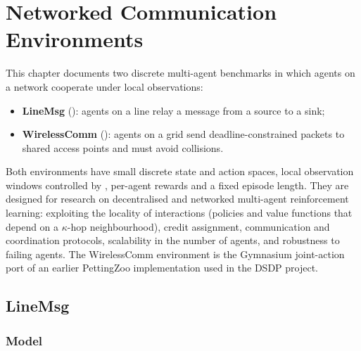 \begingroup
\setlength{\emergencystretch}{3em}
\chapter{Networked Communication Environments}\label{chap:networked}

This chapter documents two discrete multi-agent benchmarks in which agents on a
network cooperate under local observations:

\begin{itemize}
  \item \textbf{LineMsg} (): agents on
        a line relay a message from a source to a sink;
  \item \textbf{WirelessComm}
        (): agents on a grid
        send deadline-constrained packets to shared access points and must avoid
        collisions.
\end{itemize}

Both environments have small discrete state and action spaces, local
observation windows controlled by , per-agent rewards
and a fixed episode length. They are designed for research on decentralised
and networked multi-agent reinforcement learning: exploiting the locality of
interactions (policies and value functions that depend on a $\kappa$-hop
neighbourhood), credit assignment, communication and coordination protocols,
scalability in the number of agents, and robustness to failing agents. The
WirelessComm environment is the Gymnasium joint-action port of an earlier
PettingZoo implementation used in the DSDP project.

\section{LineMsg}\label{sec:linemsg}

\subsection{Model}\label{sec:linemsg-model}

